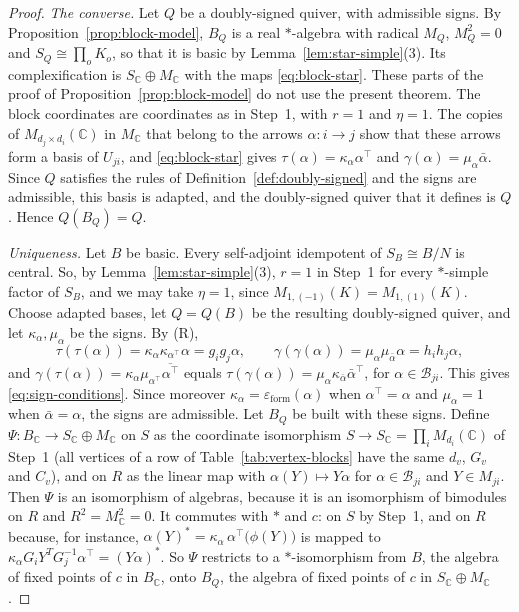 \documentclass[12pt, a4paper]{report}
\theoremstyle{plain}
\theoremstyle{definition}
\theoremstyle{remark}
\theoremstyle{plain}
\newcommand{\epsilonform}{\varepsilon_{\mathrm{form}}}
\newcommand{\CC}{\mathbb{C}}
\begin{document}
\begin{proof}
\emph{The converse.} Let $Q$ be a doubly-signed quiver, with admissible signs. By Proposition~\ref{prop:block-model}, $B_Q$ is a real $*$-algebra with radical $M_Q$, $M_Q^2=0$ and $S_Q\cong\prod_oK_o$, so that it is basic by Lemma~\ref{lem:star-simple}(3). Its complexification is $S_\CC\oplus M_\CC$ with the maps \eqref{eq:block-star}. These parts of the proof of Proposition~\ref{prop:block-model} do not use the present theorem. The block coordinates are coordinates as in Step~1, with $r=1$ and $\eta=1$. The copies of $M_{d_j\times d_i}(\CC)$ in $M_\CC$ that belong to the arrows $\alpha:i\to j$ show that these arrows form a basis of $U_{ji}$, and \eqref{eq:block-star} gives $\tau(\alpha)=\kappa_\alpha\alpha^{\top}$ and $\gamma(\alpha)=\mu_\alpha\bar\alpha$. Since $Q$ satisfies the rules of Definition~\ref{def:doubly-signed} and the signs are admissible, this basis is adapted, and the doubly-signed quiver that it defines is $Q$. Hence $Q(B_Q)=Q$.

\emph{Uniqueness.} Let $B$ be basic. Every self-adjoint idempotent of $S_B\cong B/N$ is central. So, by Lemma~\ref{lem:star-simple}(3), $r=1$ in Step~1 for every $*$-simple factor of $S_B$, and we may take $\eta=1$, since $M_{1,(-1)}(K)=M_{1,(1)}(K)$. Choose adapted bases, let $Q=Q(B)$ be the resulting doubly-signed quiver, and let $\kappa_\alpha,\mu_\alpha$ be the signs. By (R),
\[ \tau(\tau(\alpha))=\kappa_\alpha\kappa_{\alpha^{\top}}\alpha=g_ig_j\alpha,\qquad \gamma(\gamma(\alpha))=\mu_\alpha\mu_{\bar\alpha}\alpha=h_ih_j\alpha, \]
and $\gamma(\tau(\alpha))=\kappa_\alpha\mu_{\alpha^{\top}}\overline{\alpha^{\top}}$ equals $\tau(\gamma(\alpha))=\mu_\alpha\kappa_{\bar\alpha}\bar\alpha^{\top}$, for $\alpha\in\mathcal B_{ji}$. This gives \eqref{eq:sign-conditions}. Since moreover $\kappa_\alpha=\epsilonform(\alpha)$ when $\alpha^{\top}=\alpha$ and $\mu_\alpha=1$ when $\bar\alpha=\alpha$, the signs are admissible. Let $B_Q$ be built with these signs. Define $\Psi:B_\CC\to S_\CC\oplus M_\CC$ on $S$ as the coordinate isomorphism $S\to S_\CC=\prod_iM_{d_i}(\CC)$ of Step~1 (all vertices of a row of Table~\ref{tab:vertex-blocks} have the same $d_v$, $G_v$ and $C_v$), and on $R$ as the linear map with $\alpha(Y)\mapsto Y\alpha$ for $\alpha\in\mathcal B_{ji}$ and $Y\in M_{ji}$. Then $\Psi$ is an isomorphism of algebras, because it is an isomorphism of bimodules on $R$ and $R^2=M_\CC^2=0$. It commutes with $*$ and $c$: on $S$ by Step~1, and on $R$ because, for instance, $\alpha(Y)^*=\kappa_\alpha\,\alpha^{\top}\bigl(\phi(Y)\bigr)$ is mapped to $\kappa_\alpha G_iY^TG_j^{-1}\alpha^{\top}=(Y\alpha)^*$. So $\Psi$ restricts to a $*$-isomorphism from $B$, the algebra of fixed points of $c$ in $B_\CC$, onto $B_Q$, the algebra of fixed points of $c$ in $S_\CC\oplus M_\CC$.


\end{proof}
\end{document}
